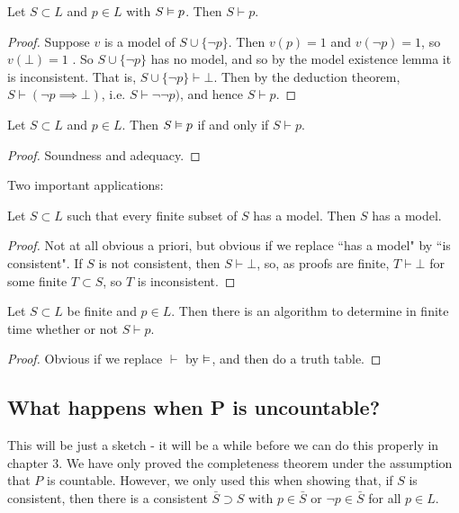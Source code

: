 \documentclass[10pt,a4paper]{article}
\begin{document}
\begin{corollary}
Let $S \subset L$ and $p \in L$ with $S \vDash p$. Then $S \vdash  p$.
\end{corollary}
\begin{proof}
Suppose $v$ is a model of $S \cup \{\neg p\}$. Then $v(p) = 1$ and $v(\neg p) = 1$, so $v(\bot) = 1$ \contr. So $S \cup \{\neg p\}$ has no model, and so by the model existence lemma it is inconsistent. That is, $S \cup \{\neg p\} \vdash \bot$. Then by the deduction theorem, $S \vdash (\neg p \implies \bot)$, i.e. $S \vdash \neg \neg p)$, and hence $S \vdash p$.
\end{proof}
\begin{theorem}
Let $S \subset L$ and $p \in L$. Then $S \vDash p$ if and only if $S \vdash p$.
\end{theorem}
\begin{proof}
Soundness and adequacy.
\end{proof}
Two important applications:
\begin{corollary}
Let $S \subset L$ such that every finite subset of $S$ has a model. Then $S$ has a model.
\end{corollary}
\begin{proof}
Not at all obvious a priori, but obvious if we replace ``has a model" by ``is consistent". If $S$ is not consistent, then $S \vdash \bot$, so, as proofs are finite, $T \vdash \bot$ for some finite $T \subset S$, so $T$ is inconsistent.
\end{proof}
\begin{corollary}
Let $S \subset L$ be finite and $p \in L$. Then there is an algorithm to determine in finite time whether or not $S \vdash p$.
\end{corollary}
\begin{proof}
Obvious if we replace $\vdash$ by $\vDash$, and then do a truth table.
\end{proof}
\subsection{What happens when P is uncountable?}
This will be just a sketch - it will be a while before we can do this properly in chapter 3. We have only proved the completeness theorem under the assumption that $P$ is countable. However, we only used this when showing that, if $S$ is consistent, then there is a consistent $\bar{S} \supset S$ with $p \in \bar{S}$ or $\neg p \in \bar{S}$ for all $p \in L$.
\end{document}
